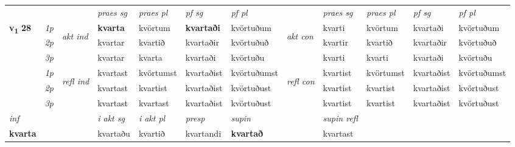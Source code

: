 \begin{longtable}[l]{X>{\footnotesize\itshape}llXXXXlXXXX}
\midrule

 & &   & \textit{praes sg}  & \textit{praes pl}    & \textit{ pf sg} & \textit{pf pl} & & \textit{praes sg}  & \textit{praes pl}    & \textit{pf sg} & \textit{pf pl }  \\ \cmidrule{4-7} \cmidrule{9-12}
 \multirow{2}{*}{{{\textbf{v{\textsubscript{1}}} \Large{\textbf{28}}}}}  & 1p & \multirow{3}{*}{\begin{turn}{90}\textit{akt ind}\end{turn}} & \textbf{kvarta} & kvörtum & \textbf{kvartaði} & kvörtuðum & \multirow{3}{*}{\begin{turn}{90}\textit{akt con}\end{turn}} &kvarti & kvörtum & kvartaði & kvörtuðum\\*
 & 2p &  &  kvartar  & kvartið & kvartaðir & kvörtuðuð & & kvartir & kvartið & kvartaðir & kvörtuðuð \\*
 & 3p &  & kvartar & kvarta & kvartaði & kvörtuðu & & kvarti & kvarti& kvartaði & kvörtuðu \\*
\cmidrule{4-7} \cmidrule{9-12}
 & 1p & \multirow{3}{*}{\begin{turn}{90}\textit{refl ind}\end{turn}}  & kvartast & kvörtumst & kvartaðist & kvörtuðumst & \multirow{3}{*}{\begin{turn}{90}\textit{refl con}\end{turn}}  &kvartist & kvörtumst & kvartaðist & kvörtuðumst \\*
 & 2p &  & kvartast & kvartist & kvartaðist & kvörtuðust & &kvartist & kvartist & kvartaðist & kvörtuðust \\*
 & 3p  & & kvartast & kvartast & kvartaðist & kvörtuðust & & kvartist & kvartist& kvartaðist & kvörtuðust \\*
\cmidrule{4-7} \cmidrule{9-12}

   {\textit{inf}} & &  & \textit{i akt sg} & \textit{i akt pl}   & \textit{presp} & \textit{supin} && \textit{supin refl}  \\*
  {\textbf{kvarta}} & && kvartaðu  & kvartið   & kvartandi &  \textbf{kvartað} && kvartast  \\*


\end{longtable}
